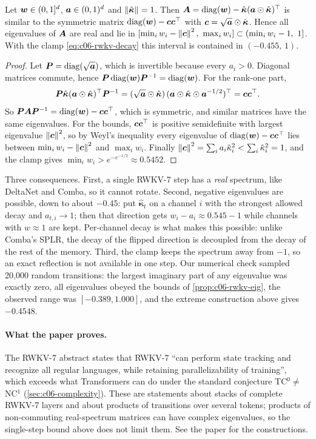 \begin{proposition}\label{prop:c06-rwkv-eig}
Let $\bm{w}\in(0,1]^{d}$, $\bm{a}\in(0,1)^{d}$ and $\left\lVert \hat{\bm\kappa}\right\rVert=1$. Then
$\bm{A}=\operatorname{diag}(\bm{w})-\hat{\bm\kappa}(\bm{a}\odot\hat{\bm\kappa})^{\top}$ is similar to the symmetric matrix
$\operatorname{diag}(\bm{w})-\bm{c}\bm{c}^{\top}$ with $\bm{c}=\sqrt{\bm{a}}\odot\hat{\bm\kappa}$. Hence all eigenvalues of $\bm{A}$
are real and lie in $[\min_iw_i-\norm{\bm{c}}^2,\ \max_iw_i]\subset(\min_iw_i-1,\ 1]$. With the
clamp \eqref{eq:c06-rwkv-decay} this interval is contained in $(-0.455,\,1)$.
\end{proposition}

\begin{proof}
Let $\bm{P}=\operatorname{diag}(\sqrt{\bm{a}})$, which is invertible because every $a_i>0$. Diagonal matrices
commute, hence $\bm{P}\operatorname{diag}(\bm{w})\bm{P}^{-1}=\operatorname{diag}(\bm{w})$. For the rank-one part,
\[
  \bm{P}\hat{\bm\kappa}(\bm{a}\odot\hat{\bm\kappa})^{\top}\bm{P}^{-1}
  =(\sqrt{\bm{a}}\odot\hat{\bm\kappa})\,(\bm{a}\odot\hat{\bm\kappa}\odot\bm{a}^{-1/2})^{\top}=\bm{c}\bm{c}^{\top} .
\]
So $\bm{P}\bm{A}\bm{P}^{-1}=\operatorname{diag}(\bm{w})-\bm{c}\bm{c}^{\top}$, which is symmetric, and similar matrices have the same
eigenvalues. For the bounds, $\bm{c}\bm{c}^{\top}$ is positive semidefinite with largest eigenvalue
$\left\lVert \bm{c}\right\rVert^2$, so by Weyl's inequality every eigenvalue of $\operatorname{diag}(\bm{w})-\bm{c}\bm{c}^{\top}$ lies between
$\min_iw_i-\left\lVert \bm{c}\right\rVert^2$ and $\max_iw_i$. Finally
$\left\lVert \bm{c}\right\rVert^2=\sum_ia_i\hat\kappa_i^2<\sum_i\hat\kappa_i^2=1$, and the clamp gives
$\min_iw_i>e^{-e^{-1/2}}\approx0.5452$.
\end{proof}

Three consequences. First, a single RWKV-7 step has a \emph{real} spectrum, like DeltaNet and
Comba, so it cannot rotate. Second, negative eigenvalues are possible, down to about
$-0.45$: put $\hat{\bm\kappa}_t$ on a channel $i$ with the strongest allowed decay and
$a_{t,i}\to1$; then that direction gets $w_i-a_i\approx0.545-1$ while channels with $w\approx1$
are kept. Per-channel decay is what makes this possible: unlike Comba's SPLR, the decay of
the flipped direction is decoupled from the decay of the rest of the memory. Third, the
clamp keeps the spectrum away from $-1$, so an exact reflection is not available in one step.
Our numerical check sampled 20{,}000 random transitions: the largest imaginary part of any
eigenvalue was exactly zero, all eigenvalues obeyed the bounds of
\cref{prop:c06-rwkv-eig}, the observed range was $[-0.389,1.000]$, and the extreme
construction above gives $-0.4548$.

\paragraph{What the paper proves.} The RWKV-7 abstract states that RWKV-7 ``can perform state
tracking and recognize all regular languages, while retaining parallelizability of
training'', which exceeds what Transformers can do under the standard conjecture
TC$^0\ne$ NC$^1$ (\cref{sec:c06-complexity}). These are statements about stacks of complete
RWKV-7 layers and about products of transitions over several tokens; products of
non-commuting real-spectrum matrices can have complex eigenvalues, so the single-step bound
above does not limit them. See the paper for the constructions.

